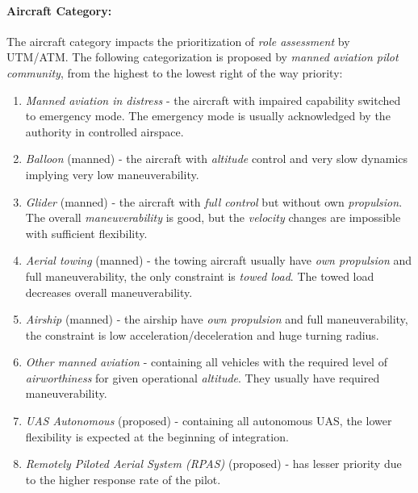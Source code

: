 \newpage
\paragraph{Aircraft Category:} The aircraft category impacts the prioritization of \emph{role assessment} by UTM/ATM. The following categorization is proposed by \emph{manned aviation pilot community}, from the highest to the lowest right of the way priority:

\begin{enumerate}
    \item \emph{Manned aviation in distress} \cite{icaoAnnex2} -  the aircraft with impaired capability switched to emergency mode. The emergency mode is usually acknowledged by the authority in controlled airspace. 
    
    \item \emph{Balloon} (manned) \cite{icaoAnnex2} - the aircraft with \emph{altitude} control and very slow dynamics implying very low maneuverability.  
    
    \item \emph{Glider} (manned) \cite{icaoAnnex2} - the aircraft with \emph{full control} but without own \emph{propulsion}. The overall \emph{maneuverability} is good, but the \emph{velocity} changes are impossible with sufficient flexibility.
    
    \item \emph{Aerial towing} (manned) \cite{icaoAnnex2} - the towing aircraft usually have \emph{own propulsion} and full maneuverability, the only constraint is \emph{towed load}. The towed load decreases overall maneuverability.
    
    \item \emph{Airship} (manned) \cite{icaoAnnex2} - the airship have \emph{own propulsion} and full maneuverability, the constraint is low acceleration/deceleration and huge turning radius.
    
    \item \emph{Other manned aviation} \cite{icaoAnnex2} - containing all vehicles with the required level of \emph{airworthiness} for given operational \emph{altitude}. They usually have required maneuverability.
    
    \item \emph{UAS Autonomous} (proposed) \cite{santiago2015pilot} - containing all autonomous UAS, the lower flexibility is expected at the beginning of integration.
    
    \item \emph{Remotely Piloted Aerial System (RPAS)} (proposed)  \cite{santiago2015pilot} - has lesser priority due to the higher response rate of the pilot.
\end{enumerate}

